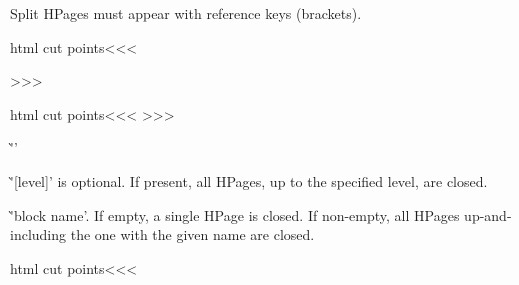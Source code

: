 {{Split HPages must appear with reference keys (brackets).




\<html cut points\><<<
\def\HPageButton{\strt:bt\ch:bbtf}
\def\ch:bbtf{\ifx -\:temp \expandafter\op:bbft
             \else \expandafter\:bbtf \fi}
\def\:bbtf[#1]#2{%
   \:hookI{BeforeHPageButton}{}{#2}%
   \hpg:wrn{#1}{#2}\HPageButton
   \TagFile{|<fr bt fl|>\:temp}%
   \edef\HP:file{\RefFile\:temp}%
   \def\:temp{#2}\ifx \:temp\empty 
   \else  \HP:Link#2\EndLink  \fi
   \:hookI{AfterHPageButton}{}{#2}%
   \csname AfterHPage\endcsname  }

\def\op:bbft#1[#2]{%
   \:hookI{BeforeHPageButton}{}{}%
   \edef\:temp{#2}%
   \ifx \:temp\empty \:warning{\string\HPageButton-[]?}\fi
   \TagFile{|<fr bt fl|>\:temp}%
   \edef\HP:file{\RefFile\:temp}%
   \HP:Link%
   \def\ContHPage{\EndLink
      \:hookI{AfterHPageButton}{}{}%
      \csname AfterHPage\endcsname  }}
>>>


\<html cut points\><<<
\def\BeginHPage{\futurelet\:temp\ch:bbbt}
\def\ch:bbbt{%
   |<entring file of hpage|>%
   \NewFileName\HP:file   \Save:Link\HP:file 
   \ifx -\:temp  \expandafter\op:bbbt
   \else         \expandafter\:bbbt   \fi}
\def\:bbbt[#1]#2{%
   \PushStack\:btid{#1}%
   \:btfile{#2}%
   \:buttrc\BeginHPage{[#1]{#2}}%
   \PushStack\:afterbt\empty 
   \hpg:wrn{#1}{#2}\BeginHPage    \Save:HPageTag\:temp
   \Save:HPage{#2}%
   \TagFile{\:temp}}
\def\op:bbbt#1[#2]{%
   \PushStack\:btid{#2}%
   \:hookI{AfterHPageButton}{}{}%
   \:btfile{}%
   \:buttrc\BeginHPage{[#2]}%
   \PushStack\:afterbt\empty    \edef\:temp{#2}%
   \ifx \:temp\empty \:warning{\string\BeginHPage-[]?}\fi
   \Save:HPageTag\:temp   \Save:HPage{}%
   \TagFile{\:temp}}
>>>






\`''

\List{$\bullet$}

\item \`'[level]' is optional. If present, all HPages, up to the
specified level, are closed.

\item \`'block name'. If empty, a single HPage is closed. If
non-empty, all HPages up-and-including the one with the given name
are closed.

\EndList

\<html cut points\><<<
\def\EndHPage{\futurelet\:temp\chEnd:HPage}
\def\chEnd:HPage{\ifx  [\:temp  \expandafter\opEnd:HPage
              \else          \expandafter\End:HPage   \fi}
\def\opEnd:HPage[#1]{%
   \ifnum  #1>\HPageDepth\space
      \:warning{\string\EndHPage[#1]?}%
      \let\:temp|=\:gobble 
   \else \ifnum  #1<\HPageDepth\space
      \def\:temp{\:EndHPage\EndHPage[#1]{}}%
   \else \let\:temp|=\End:HPage \fi \fi
   \:temp }

}}

